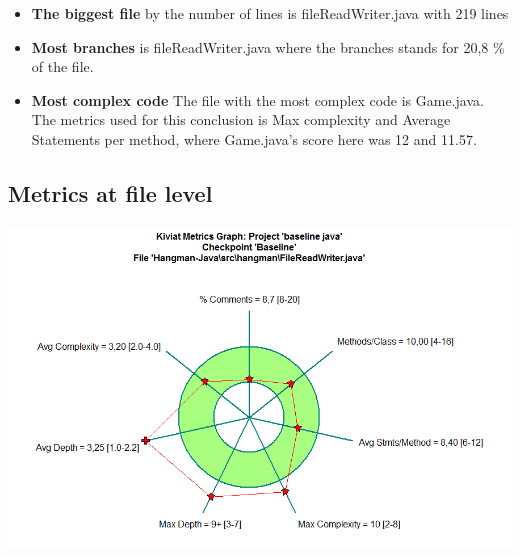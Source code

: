 \documentclass{article}
\begin{document}
\begin{itemize}
 \item
 \textbf{The biggest file} by the number of lines is fileReadWriter.java with 219 lines
\item
  \textbf{Most branches} is fileReadWriter.java where the branches stands for 20,8 \% of the file. 
\item
\textbf{Most complex code}
  The file with the most complex code is Game.java. The metrics used for this conclusion is Max complexity and Average Statements per method, where Game.java's score here was 12 and 11.57.
\end{itemize}

\subsection{Metrics at file level}
\vspace {0.10 cm}
\begin{center}
\includegraphics[scale=0.4]{FileReadWriter-kiviat-before.png}
\end{center}
\end{document}
